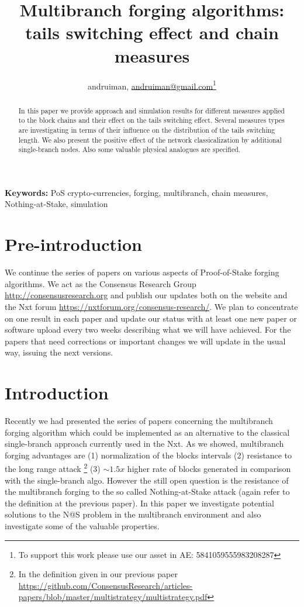 \documentclass[12pt]{article}
\author{andruiman, \href{maito: andruiman@gmail.com}{andruiman@gmail.com}\footnote{To support this work please use our asset in AE: 5841059555983208287}}
\title{Multibranch forging algorithms: tails switching effect and chain measures}
\begin{document}
\maketitle
\begin{abstract}
In this paper we provide approach and simulation results for different measures applied to the block chains and their effect on the tails switching 
effect. Several measures types are investigating in terms of their influence on the distribution of the tails switching length. We also
present the positive effect of the network classicalization by additional single-branch nodes. Also some valuable physical analogues
are specified.
\end{abstract}

\noindent
{\bf Keywords:} PoS crypto-currencies, forging, multibranch, chain measures, Nothing-at-Stake, simulation

\section{Pre-introduction}

We continue the series of papers on various aspects of Proof-of-Stake forging algorithms. We act as the Consensus Research 
Group \url{http://consensusresearch.org} and publish our updates both on the website and the Nxt forum \url{https://nxtforum.org/consensus-research/}.
We plan to concentrate on one result in each paper and update our status with at least one new paper or software upload every two weeks describing 
what we will have achieved. For the papers that need corrections or important changes we will update in the usual way,
issuing the next versions. 
 

\section{Introduction}

Recently we had presented the series of papers concerning the multibranch forging algorithm which could be implemented as an alternative
to the classical single-branch approach currently used in the Nxt. As we showed, multibranch forging advantages are (1) normalization of
the blocks intervals (2) resistance to the long range attack \footnote{In the definition given in our previous paper \url{https://github.com/ConsensusResearch/articles-papers/blob/master/multistrategy/multistrategy.pdf}} (3) $\sim 1.5x$ higher
rate of blocks generated in comparison with the single-branch algo. However the still open question is the resistance of the multibranch forging
to the so called Nothing-at-Stake attack (again refer to the definition at the previous paper). In this paper we investigate potential solutions 
to the N@S problem in the multibranch environment and also investigate some of the valuable properties. 
\end{document}
